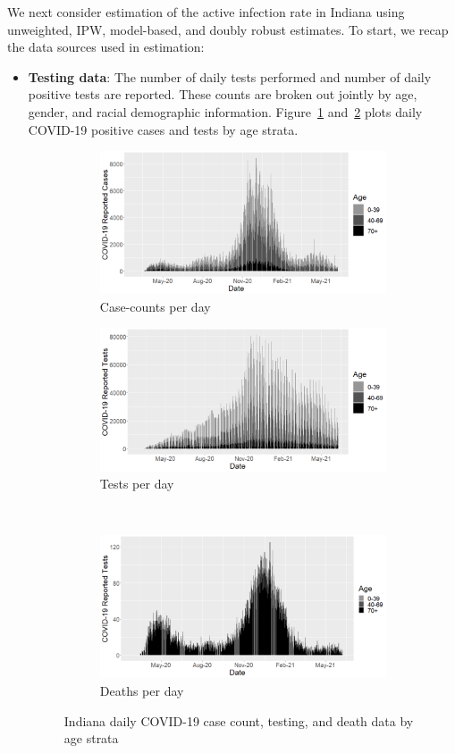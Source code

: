 \documentclass[11pt]{amsart}
\numberwithin{equation}{section}
\theoremstyle{plain}
\begin{document}
We next consider estimation of the active infection rate in Indiana using unweighted, IPW, model-based, and doubly robust estimates. To start, we recap the data sources used in estimation:
\begin{itemize}[leftmargin=*]
\item {\bf Testing data}:  The number of daily tests performed and number of daily positive tests are reported.  These counts are broken out jointly by age, gender, and racial demographic information.  Figure~\ref{fig:in-cases} and~\ref{fig:in-tests} plots daily COVID-19 positive cases and tests by age strata.

\begin{figure}
\centering
\begin{subfigure}{.45\textwidth}
 \centering
 \includegraphics[width=.9\linewidth]{../figs/indianacasecounts_byage.png}
 \caption{Case-counts per day}
 \label{fig:in-cases}
\end{subfigure}
\begin{subfigure}{.45\textwidth}
 \centering
 \includegraphics[width=.9\linewidth]{../figs/indianacovidtests_byage.png}
\caption{Tests per day}
\label{fig:in-tests}
\end{subfigure} \\ [1ex]
\begin{subfigure}{\linewidth}
\centering
\includegraphics[width=.45\linewidth]{../figs/indianadeaths_byage.png}
 \caption{Deaths per day}
 \label{fig:in-deaths}
\end{subfigure}
\caption{Indiana daily COVID-19 case count, testing, and death data by age strata}
\end{figure}


\end{itemize}
\end{document}
